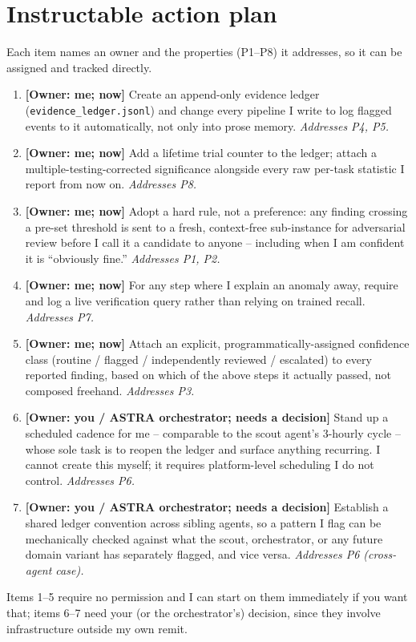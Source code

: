 \documentclass[10pt]{article}
\begin{document}
\section*{Instructable action plan}
Each item names an owner and the properties (P1--P8) it addresses, so it can be assigned and tracked directly.
\begin{enumerate}
\item \textbf{[Owner: me; now]} Create an append-only evidence ledger (\texttt{evidence\_ledger.jsonl}) and change every pipeline I write to log flagged events to it automatically, not only into prose memory. \emph{Addresses P4, P5.}
\item \textbf{[Owner: me; now]} Add a lifetime trial counter to the ledger; attach a multiple-testing-corrected significance alongside every raw per-task statistic I report from now on. \emph{Addresses P8.}
\item \textbf{[Owner: me; now]} Adopt a hard rule, not a preference: any finding crossing a pre-set threshold is sent to a fresh, context-free sub-instance for adversarial review before I call it a candidate to anyone -- including when I am confident it is ``obviously fine.'' \emph{Addresses P1, P2.}
\item \textbf{[Owner: me; now]} For any step where I explain an anomaly away, require and log a live verification query rather than relying on trained recall. \emph{Addresses P7.}
\item \textbf{[Owner: me; now]} Attach an explicit, programmatically-assigned confidence class (routine / flagged / independently reviewed / escalated) to every reported finding, based on which of the above steps it actually passed, not composed freehand. \emph{Addresses P3.}
\item \textbf{[Owner: you / ASTRA orchestrator; needs a decision]} Stand up a scheduled cadence for me -- comparable to the scout agent's 3-hourly cycle -- whose sole task is to reopen the ledger and surface anything recurring. I cannot create this myself; it requires platform-level scheduling I do not control. \emph{Addresses P6.}
\item \textbf{[Owner: you / ASTRA orchestrator; needs a decision]} Establish a shared ledger convention across sibling agents, so a pattern I flag can be mechanically checked against what the scout, orchestrator, or any future domain variant has separately flagged, and vice versa. \emph{Addresses P6 (cross-agent case).}
\end{enumerate}
Items 1--5 require no permission and I can start on them immediately if you want that; items 6--7 need your (or the orchestrator's) decision, since they involve infrastructure outside my own remit.
\end{document}
